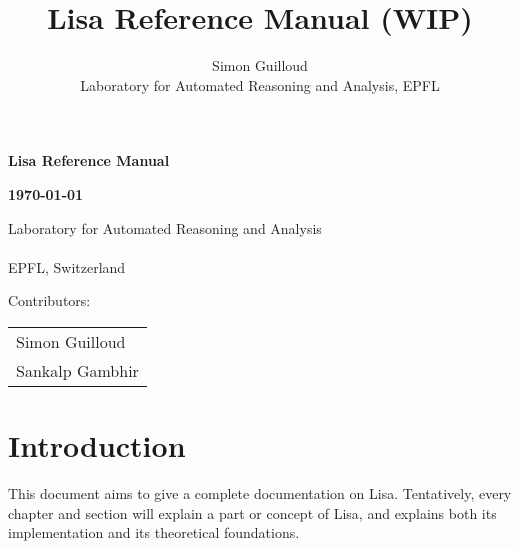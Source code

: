 \documentclass[11pt,b5paper,fullpage]{book}
\title{Lisa Reference Manual (WIP)}
\author{Simon Guilloud\\Laboratory for Automated Reasoning and Analysis, EPFL}
\date{}
\begin{document}
 


\begin{titlepage}
\sf

    \begin{center}
        \vspace*{1cm}
 
        \textbf{\Huge Lisa Reference Manual}

        \vspace{1.5cm}
        
        
        \textbf{\large \today}
             
        \vspace{1.5cm}
 
        {\Large Laboratory for Automated Reasoning and Analysis \\ \ \\ EPFL, Switzerland}

        \vspace{1.5cm}

        \date{}

    \end{center}

   \vfill

   \begin{flushright}
    \begin{minipage}{15em}
      \Large
         Contributors: \\[1ex]
        \hspace*{3em} \begin{tabular}{l}
         Simon Guilloud\\
         Sankalp Gambhir
        \end{tabular}
    \end{minipage}
   \end{flushright}
             
 \end{titlepage}
\chapter*{Introduction}

This document aims to give a complete documentation on Lisa. Tentatively, every chapter and section will explain a part or concept of Lisa, and explains both its implementation and its theoretical foundations. 

\tableofcontents













\end{document}
